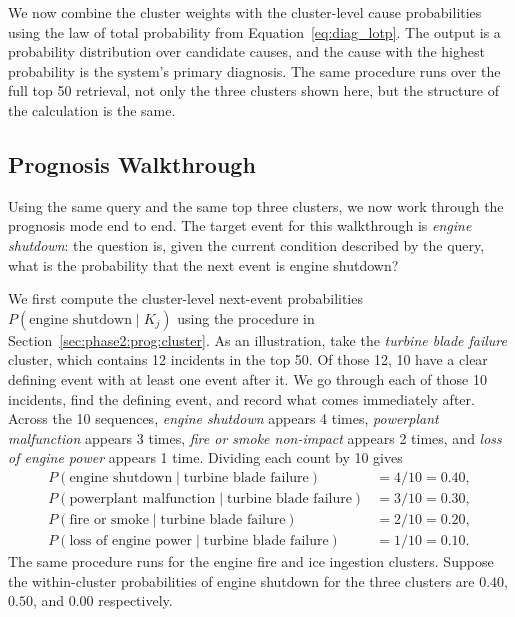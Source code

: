\documentclass[11pt]{article}
\begin{document}
We now combine the cluster weights with the cluster-level cause probabilities using the law of total probability from Equation~\ref{eq:diag_lotp}. The output is a probability distribution over candidate causes, and the cause with the highest probability is the system's primary diagnosis. The same procedure runs over the full top 50 retrieval, not only the three clusters shown here, but the structure of the calculation is the same.

\subsection{Prognosis Walkthrough}
\label{sec:verify_phase2:prog}

Using the same query and the same top three clusters, we now work through the prognosis mode end to end. The target event for this walkthrough is \emph{engine shutdown}: the question is, given the current condition described by the query, what is the probability that the next event is engine shutdown?

We first compute the cluster-level next-event probabilities $P(\text{engine shutdown} \mid K_j)$ using the procedure in Section~\ref{sec:phase2:prog:cluster}. As an illustration, take the \emph{turbine blade failure} cluster, which contains 12 incidents in the top 50. Of those 12, 10 have a clear defining event with at least one event after it. We go through each of those 10 incidents, find the defining event, and record what comes immediately after. Across the 10 sequences, \emph{engine shutdown} appears 4 times, \emph{powerplant malfunction} appears 3 times, \emph{fire or smoke non-impact} appears 2 times, and \emph{loss of engine power} appears 1 time. Dividing each count by 10 gives
\begin{align*}
P(\text{engine shutdown} \mid \text{turbine blade failure}) &= 4/10 = 0.40, \\
P(\text{powerplant malfunction} \mid \text{turbine blade failure}) &= 3/10 = 0.30, \\
P(\text{fire or smoke} \mid \text{turbine blade failure}) &= 2/10 = 0.20, \\
P(\text{loss of engine power} \mid \text{turbine blade failure}) &= 1/10 = 0.10.
\end{align*}
The same procedure runs for the engine fire and ice ingestion clusters. Suppose the within-cluster probabilities of engine shutdown for the three clusters are $0.40$, $0.50$, and $0.00$ respectively.
\end{document}
